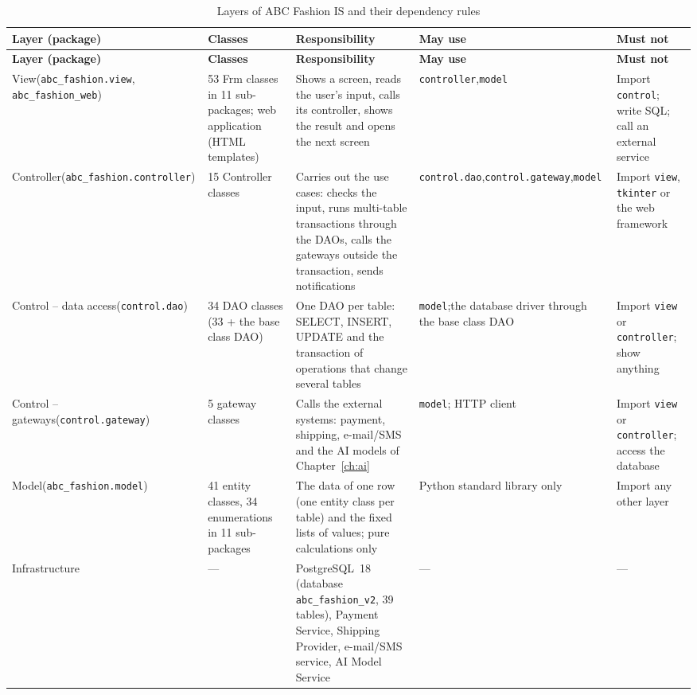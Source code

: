 {\small
\begin{xltabular}{\textwidth}{@{}L{2.4cm} L{2.2cm} Y L{2.3cm} L{2.0cm}@{}}
\caption{Layers of ABC Fashion IS and their dependency rules}\label{tab:layers}\\
\toprule
\textbf{Layer (package)} & \textbf{Classes} & \textbf{Responsibility} & \textbf{May use} & \textbf{Must not} \\ \midrule
\endfirsthead
\toprule
\textbf{Layer (package)} & \textbf{Classes} & \textbf{Responsibility} & \textbf{May use} & \textbf{Must not} \\ \midrule
\endhead
\bottomrule
\endlastfoot
View\newline (\texttt{abc\_fashion.\allowbreak view}, \texttt{abc\_fashion\_web}) & 53 \textsf{Frm} classes in 11 sub-packages; web application (HTML templates) & Shows a screen, reads the user's input, calls its controller, shows the result and opens the next screen & \texttt{controller},\newline \texttt{model} & Import \texttt{control}; write SQL; call an external service \\
Controller\newline (\texttt{abc\_fashion.\allowbreak controller}) & 15 \textsf{Controller} classes & Carries out the use cases: checks the input, runs multi-table transactions through the DAOs, calls the gateways outside the transaction, sends notifications & \texttt{control.\allowbreak dao},\newline \texttt{control.\allowbreak gateway},\newline \texttt{model} & Import \texttt{view}, \texttt{tkinter} or the web framework \\
Control -- data access\newline (\texttt{control.dao}) & 34 \textsf{DAO} classes (33 + the base class \textsf{DAO}) & One DAO per table: SELECT, INSERT, UPDATE and the transaction of operations that change several tables & \texttt{model};\newline the database driver through the base class \textsf{DAO} & Import \texttt{view} or \texttt{controller}; show anything \\
Control -- gateways\newline (\texttt{control.\allowbreak gateway}) & 5 gateway classes & Calls the external systems: payment, shipping, e-mail/SMS and the AI models of Chapter~\ref{ch:ai} & \texttt{model}; HTTP client & Import \texttt{view} or \texttt{controller}; access the database \\
Model\newline (\texttt{abc\_fashion.\allowbreak model}) & 41 entity classes, 34 enumerations in 11 sub-packages & The data of one row (one entity class per table) and the fixed lists of values; pure calculations only & Python standard library only & Import any other layer \\
Infrastructure & --- & PostgreSQL~18 (database \texttt{abc\_fashion\_v2}, 39 tables), Payment Service, Shipping Provider, e-mail/SMS service, AI Model Service & --- & --- \\
\end{xltabular}
}

